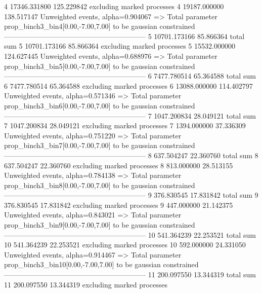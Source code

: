 4          17346.331800    125.229842      excluding marked processes    
4          19187.000000    138.517147      Unweighted events, alpha=0.904067
  => Total parameter prop_binch3_bin4[0.00,-7.00,7.00] to be gaussian constrained
------------------------------------------------------------
5          10701.173166    85.866364       total sum                     
5          10701.173166    85.866364       excluding marked processes    
5          15532.000000    124.627445      Unweighted events, alpha=0.688976
  => Total parameter prop_binch3_bin5[0.00,-7.00,7.00] to be gaussian constrained
------------------------------------------------------------
6          7477.780514     65.364588       total sum                     
6          7477.780514     65.364588       excluding marked processes    
6          13088.000000    114.402797      Unweighted events, alpha=0.571346
  => Total parameter prop_binch3_bin6[0.00,-7.00,7.00] to be gaussian constrained
------------------------------------------------------------
7          1047.200834     28.049121       total sum                     
7          1047.200834     28.049121       excluding marked processes    
7          1394.000000     37.336309       Unweighted events, alpha=0.751220
  => Total parameter prop_binch3_bin7[0.00,-7.00,7.00] to be gaussian constrained
------------------------------------------------------------
8          637.504247      22.360760       total sum                     
8          637.504247      22.360760       excluding marked processes    
8          813.000000      28.513155       Unweighted events, alpha=0.784138
  => Total parameter prop_binch3_bin8[0.00,-7.00,7.00] to be gaussian constrained
------------------------------------------------------------
9          376.830545      17.831842       total sum                     
9          376.830545      17.831842       excluding marked processes    
9          447.000000      21.142375       Unweighted events, alpha=0.843021
  => Total parameter prop_binch3_bin9[0.00,-7.00,7.00] to be gaussian constrained
------------------------------------------------------------
10         541.364239      22.253521       total sum                     
10         541.364239      22.253521       excluding marked processes    
10         592.000000      24.331050       Unweighted events, alpha=0.914467
  => Total parameter prop_binch3_bin10[0.00,-7.00,7.00] to be gaussian constrained
------------------------------------------------------------
11         200.097550      13.344319       total sum                     
11         200.097550      13.344319       excluding marked processes    
